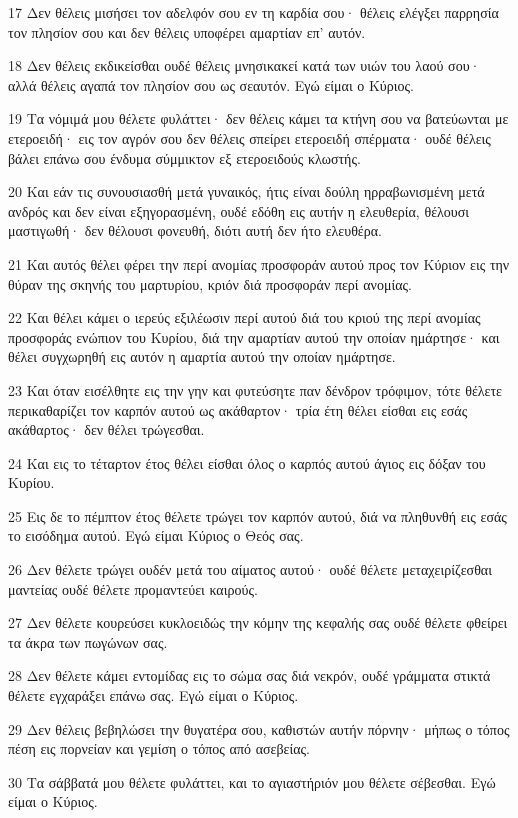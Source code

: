 \par 17 Δεν θέλεις μισήσει τον αδελφόν σου εν τη καρδία σου· θέλεις ελέγξει παρρησία τον πλησίον σου και δεν θέλεις υποφέρει αμαρτίαν επ' αυτόν.
\par 18 Δεν θέλεις εκδικείσθαι ουδέ θέλεις μνησικακεί κατά των υιών του λαού σου· αλλά θέλεις αγαπά τον πλησίον σου ως σεαυτόν. Εγώ είμαι ο Κύριος.
\par 19 Τα νόμιμά μου θέλετε φυλάττει· δεν θέλεις κάμει τα κτήνη σου να βατεύωνται με ετεροειδή· εις τον αγρόν σου δεν θέλεις σπείρει ετεροειδή σπέρματα· ουδέ θέλεις βάλει επάνω σου ένδυμα σύμμικτον εξ ετεροειδούς κλωστής.
\par 20 Και εάν τις συνουσιασθή μετά γυναικός, ήτις είναι δούλη ηρραβωνισμένη μετά ανδρός και δεν είναι εξηγορασμένη, ουδέ εδόθη εις αυτήν η ελευθερία, θέλουσι μαστιγωθή· δεν θέλουσι φονευθή, διότι αυτή δεν ήτο ελευθέρα.
\par 21 Και αυτός θέλει φέρει την περί ανομίας προσφοράν αυτού προς τον Κύριον εις την θύραν της σκηνής του μαρτυρίου, κριόν διά προσφοράν περί ανομίας.
\par 22 Και θέλει κάμει ο ιερεύς εξιλέωσιν περί αυτού διά του κριού της περί ανομίας προσφοράς ενώπιον του Κυρίου, διά την αμαρτίαν αυτού την οποίαν ημάρτησε· και θέλει συγχωρηθή εις αυτόν η αμαρτία αυτού την οποίαν ημάρτησε.
\par 23 Και όταν εισέλθητε εις την γην και φυτεύσητε παν δένδρον τρόφιμον, τότε θέλετε περικαθαρίζει τον καρπόν αυτού ως ακάθαρτον· τρία έτη θέλει είσθαι εις εσάς ακάθαρτος· δεν θέλει τρώγεσθαι.
\par 24 Και εις το τέταρτον έτος θέλει είσθαι όλος ο καρπός αυτού άγιος εις δόξαν του Κυρίου.
\par 25 Εις δε το πέμπτον έτος θέλετε τρώγει τον καρπόν αυτού, διά να πληθυνθή εις εσάς το εισόδημα αυτού. Εγώ είμαι Κύριος ο Θεός σας.
\par 26 Δεν θέλετε τρώγει ουδέν μετά του αίματος αυτού· ουδέ θέλετε μεταχειρίζεσθαι μαντείας ουδέ θέλετε προμαντεύει καιρούς.
\par 27 Δεν θέλετε κουρεύσει κυκλοειδώς την κόμην της κεφαλής σας ουδέ θέλετε φθείρει τα άκρα των πωγώνων σας.
\par 28 Δεν θέλετε κάμει εντομίδας εις το σώμα σας διά νεκρόν, ουδέ γράμματα στικτά θέλετε εγχαράξει επάνω σας. Εγώ είμαι ο Κύριος.
\par 29 Δεν θέλεις βεβηλώσει την θυγατέρα σου, καθιστών αυτήν πόρνην· μήπως ο τόπος πέση εις πορνείαν και γεμίση ο τόπος από ασεβείας.
\par 30 Τα σάββατά μου θέλετε φυλάττει, και το αγιαστήριόν μου θέλετε σέβεσθαι. Εγώ είμαι ο Κύριος.
